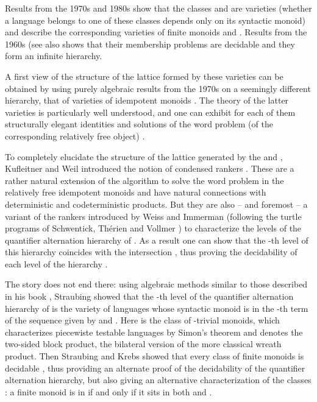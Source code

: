 \documentclass{llncs}
\begin{document}
Results from the 1970s and 1980s \cite{1976:Schutzenberger,1980:Pin} show that the classes  and  are varieties (whether a language  belongs to one of these classes depends only on its syntactic monoid) and describe the corresponding varieties of finite monoids  and . Results from the 1960s \cite{1965:KrohnRhodesTilson} (see also \cite{1993:Weil,2009:RhodesSteinberg,2010:KufleitnerWeil} shows that their membership problems are decidable and they form an infinite hierarchy.

A first view of the structure of the lattice formed by these varieties can be obtained by using purely algebraic results from the 1970s on a seemingly different hierarchy, that of varieties of idempotent monoids \cite{1970:Gerhard}. The theory of the latter varieties is particularly well understood, and one can exhibit for each of them structurally elegant identities and solutions of the word problem (of the corresponding relatively free object) \cite{1989:GerhardPetrich}.

To completely elucidate the structure of the lattice generated by the  and , Kufleitner and Weil introduced the notion of condensed rankers \cite{2012:Kuf-leitnerWeil}. These are a rather natural extension of the algorithm to solve the word problem in the relatively free idempotent monoids and have natural connections with deterministic and codeterministic products. But they are also -- and foremost -- a variant of the rankers introduced by Weiss and Immerman \cite{2009:WeisImmerman} (following the turtle programs of Schwentick, Th\'erien and Vollmer \cite{2001:SchwentickTherienVollmer}) to characterize the levels of the quantifier alternation hierarchy of . As a result one can show that the -th level of this hierarchy coincides with the intersection , thus proving the decidability of each level of the hierarchy \cite{2012:KufleitnerWeil-CSL}.

The story does not end there: using algebraic methods similar to those described in his book \cite{1994:Straubing}, Straubing showed \cite{2011:Straubing} that the -th level of the quantifier alternation hierarchy of  is the variety of languages whose syntactic monoid is in the -th term of the sequence given by  and . Here  is the class of -trivial monoids, which characterizes piecewiste testable languages by Simon's theorem \cite{1975:Simon} and  denotes the two-sided block product, the bilateral version of the more classical wreath product. Then Straubing and Krebs showed that every class of finite monoids is decidable \cite{2012:KrebsStraubing}, thus providing an alternate proof of the decidability of the quantifier alternation hierarchy, but also giving an alternative characterization of the classes : a finite monoid  is in  if and only if it sits in both  and  .
\end{document}
